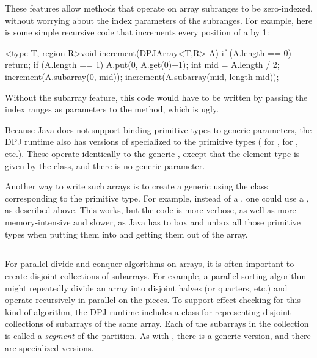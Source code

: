 These features allow methods that operate on array subranges to be
zero-indexed, without worrying about the index parameters of the
subranges.  For example, here is some simple recursive code that
increments every position of a  by 1:
%
\begin{dpjlisting}
<type T, region R>void increment(DPJArray<T,R> A) {
    if (A.length == 0) return;
    if (A.length == 1) {
        A.put(0, A.get(0)+1);
    }
    int mid = A.length / 2;
    increment(A.subarray(0, mid));
    increment(A.subarray(mid, length-mid));
}
\end{dpjlisting}
%
Without the subarray feature, this code would have to be written by
passing the index ranges as parameters to the  method,
which is ugly.

 Because Java does not support
binding primitive types to generic parameters, the DPJ runtime also
has versions of  specialized to the primitive types
( for ,  for ,
etc.).  These operate identically to the generic ,
except that the element type is given by the class, and there is no
generic parameter.

Another way to write such arrays is to create a generic 
using the class corresponding to the primitive type.  For example,
instead of a , one could use a
, as described above.  This works, but the code
is more verbose, as well as more memory-intensive and slower, as Java
has to box and unbox all those primitive types when putting them into
and getting them out of the array.


\subsection{%
\label{sec:runtime:partition}}

For parallel divide-and-conquer algorithms on arrays, it is often
important to create disjoint collections of subarrays.  For example, a
parallel sorting algorithm might repeatedly divide an array into
disjoint halves (or quarters, etc.) and operate recursively in
parallel on the pieces.  To support effect checking for this kind of
algorithm, the DPJ runtime includes a class  for
representing disjoint collections of subarrays of the same array.
Each of the subarrays in the collection is called a \emph{segment} of
the partition.  As with , there is a generic version,
and there are specialized versions.

